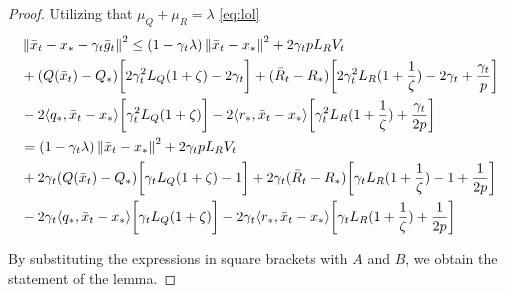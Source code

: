 \begin{proof}
    Utilizing that $\mu_Q + \mu_R = \lambda$ \eqref{eq:lol}
    \begin{align}
        \begin{split}
             &\left\|\bar{x}_t - x_* - \gamma_{t} \bar{g}_t\right\|^2 \leq 
            (1 - \gamma_{t} \lambda)\left\|\bar{x}_t - x_*\right\|^2 + 2 \gamma_{t} p L_R V_t \\
            &+ (Q(\bar{x}_t) - Q_*)\biggr[ 2\gamma_{t}^2 L_Q (1+\zeta) - 2\gamma_{t} \biggr]
            + (\bar{R}_t - R_*)\biggr[ 2\gamma_{t}^2 L_R (1+\frac{1}{\zeta}) - 2\gamma_{t} + \frac{\gamma_{t}}{p} \biggr] \\
            &- 2\langle q_*, \bar{x}_t - x_*\rangle\biggr[ \gamma_{t}^2 L_Q(1+\zeta) \biggr]
            - 2\langle r_*, \bar{x}_t - x_*\rangle\biggr[ \gamma_{t}^2 L_R(1+\frac{1}{\zeta}) + \frac{\gamma_{t}}{2p} \biggr] \\
            &= (1 - \gamma_{t} \lambda)\left\|\bar{x}_t - x_*\right\|^2 + 2 \gamma_{t} p L_R V_t \\
            &+ 2\gamma_{t} (Q(\bar{x}_t) - Q_*)\biggr[ \gamma_{t} L_Q (1+\zeta) - 1 \biggr] 
            + 2\gamma_{t} (\bar{R}_t - R_*)\biggr[ \gamma_{t} L_R (1+\frac{1}{\zeta}) - 1 + \frac{1}{2p} \biggr] \\
            &- 2\gamma_{t} \langle q_*, \bar{x}_t - x_*\rangle\biggr[ \gamma_{t} L_Q(1+\zeta)  \biggr]
            - 2\gamma_{t} \langle r_*, \bar{x}_t - x_*\rangle\biggr[ \gamma_{t} L_R(1+\frac{1}{\zeta}) + \frac{1}{2p} \biggr]
        \end{split}
    \end{align}
        
By substituting the expressions in square brackets with $A$ and $B$, we obtain the statement of the lemma.
\end{proof}

